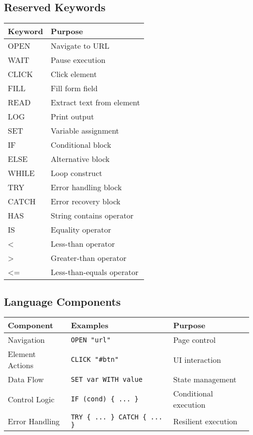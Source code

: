 \documentclass[11pt]{article}
\begin{document}
\subsection{Reserved Keywords}
\label{sec:org0617d0f}
\begin{center}
\begin{tabular}{ll}
Keyword & Purpose\\
\hline
OPEN & Navigate to URL\\
WAIT & Pause execution\\
CLICK & Click element\\
FILL & Fill form field\\
READ & Extract text from element\\
LOG & Print output\\
SET & Variable assignment\\
IF & Conditional block\\
ELSE & Alternative block\\
WHILE & Loop construct\\
TRY & Error handling block\\
CATCH & Error recovery block\\
HAS & String contains operator\\
IS & Equality operator\\
< & Less-than operator\\
> & Greater-than operator\\
<= & Less-than-equals operator\\
\end{tabular}
\end{center}
\subsection{Language Components}
\label{sec:org5a8b543}
\begin{center}
\begin{tabular}{lll}
Component & Examples & Purpose\\
\hline
Navigation & \texttt{OPEN "url"} & Page control\\
Element Actions & \texttt{CLICK "\#btn"} & UI interaction\\
Data Flow & \texttt{SET var WITH value} & State management\\
Control Logic & \texttt{IF (cond) \{ ... \}} & Conditional execution\\
Error Handling & \texttt{TRY \{ ... \} CATCH \{ ... \}} & Resilient execution\\
\end{tabular}
\end{center}
\end{document}
